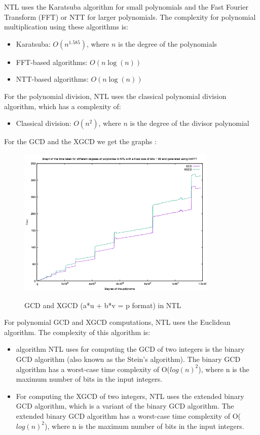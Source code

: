 NTL uses the Karatsuba algorithm for small polynomials and the Fast Fourier Transform (FFT) or NTT for larger polynomials. The complexity for polynomial multiplication using these algorithms is:
\begin{itemize}
    \item Karatsuba: $O(n^{1.585})$, where $n$ is the degree of the polynomials
    \item FFT-based algorithms: $O(n\log(n))$
    \item NTT-based algorithms: $O(n\log(n))$
\end{itemize}
For the polynomial division, NTL uses the classical polynomial division algorithm, which has a complexity of:
\begin{itemize}
    \item Classical division: $O(n^2)$, where $n$ is the degree of the divisor polynomial
\end{itemize}

For the GCD and the XGCD we get the graphs :
\begin{figure}[H]
    \centering
    \includegraphics[width=0.85\textwidth]{figures/ntl_gcd_xgcd.png}
    \label{fig2}
    \caption{GCD and XGCD (a*u + b*v = p format) in NTL}
\end{figure}

For polynomial GCD and XGCD computations, NTL uses the Euclidean algorithm. The complexity of this algorithm is:
\begin{itemize}
    \item algorithm NTL uses for computing the GCD of two integers is the binary GCD algorithm (also known as the Stein's algorithm). The binary GCD algorithm has a worst-case time complexity of O($log (n)^2$), where n is the maximum number of bits in the input integers.
    \item For computing the XGCD of two integers, NTL uses the extended binary GCD algorithm, which is a variant of the binary GCD algorithm. The extended binary GCD algorithm has a worst-case time complexity of O($log (n)^2$), where n is the maximum number of bits in the input integers.
\end{itemize}
